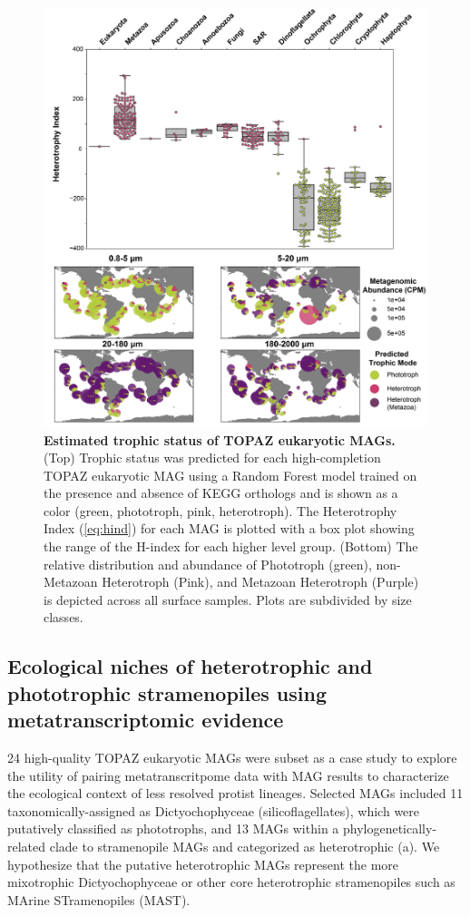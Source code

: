 \documentclass[12pt]{article}
\numberwithin{equation}{section}
\begin{document}
\begin{figure}[h!]    
    \centering
    \includegraphics[width = 0.9\columnwidth]{figures/Figure4_Trophic_Mode_v2-01.png}
    \caption{\textbf{Estimated trophic status of TOPAZ eukaryotic MAGs.} (Top) Trophic status was predicted for each high-completion TOPAZ eukaryotic MAG using a Random Forest model trained on the presence and absence of KEGG orthologs and is shown as a color (green, phototroph, pink, heterotroph). The Heterotrophy Index (\cref{eq:hind})  for each MAG is plotted with a box plot showing the range of the H-index for each higher level group. (Bottom) The relative distribution and abundance of Phototroph (green), non-Metazoan Heterotroph (Pink), and Metazoan Heterotroph (Purple) is depicted across all surface samples. Plots are subdivided by size classes. }
    \label{fig:fig4-trophy}
\end{figure}

\subsection*{Ecological niches of heterotrophic and phototrophic stramenopiles using metatranscriptomic evidence}

24 high-quality TOPAZ eukaryotic MAGs were subset as a case study to explore the utility of pairing metatranscritpome data with MAG results to characterize the ecological context of less resolved protist lineages. Selected MAGs included 11 taxonomically-assigned as Dictyochophyceae (silicoflagellates), which were putatively classified as phototrophs, and 13 MAGs within a phylogenetically-related clade to stramenopile MAGs and categorized as heterotrophic (a). We hypothesize that the putative heterotrophic MAGs represent the more mixotrophic Dictyochophyceae or other core heterotrophic stramenopiles such as MArine STramenopiles (MAST). 
\end{document}
